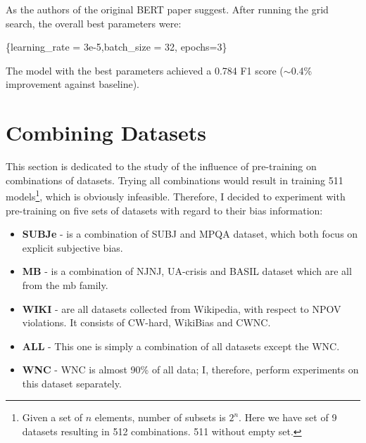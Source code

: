  As the authors of the original BERT paper suggest.  After running the grid search, the overall best parameters were:
 \begin{center}
      \{learning\_rate = 3e-5,batch\_size = 32, epochs=3\}\label{hyperparams}
 \end{center}
 
 The model with the best parameters achieved a 0.784 F1 score ($\sim$0.4\% improvement against baseline).


 
 






\section{Combining Datasets}
This section is dedicated to the study of the influence of pre-training on combinations of datasets. Trying all combinations would result in training 511 models\footnote{Given a set of $n$ elements, number of subsets is $2^n$. Here we have set of 9 datasets resulting in 512 combinations. 511 without empty set.}, which is obviously infeasible. Therefore, I decided to experiment with pre-training on five sets of datasets with regard to their bias information:
\begin{itemize}
    \item \textbf{SUBJe} - is a combination of SUBJ and MPQA dataset, which both focus on explicit subjective bias.
    \item \textbf{MB} - is a combination of NJNJ, UA-crisis and BASIL dataset which are all from the \gls{mb} family.
    \item \textbf{WIKI} - are all datasets collected from Wikipedia, with respect to NPOV violations. It consists of CW-hard, WikiBias and CWNC.
    \item \textbf{ALL} - This one is simply a combination of all datasets except the WNC.
    \item \textbf{WNC} - WNC is almost 90\% of all data; I, therefore, perform experiments on this dataset separately.
\end{itemize}
 
